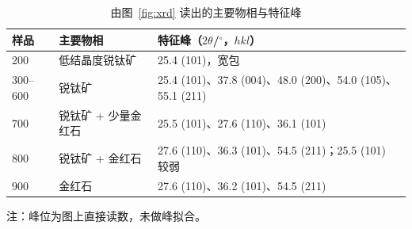 \begin{table}[H]
  \centering
  \caption{由图~\ref{fig:xrd} 读出的主要物相与特征峰}
  \label{tab:phase}
  \small
  \begin{tabular}{@{}p{1.2cm}p{3.2cm}p{10.8cm}@{}}
    \toprule
    样品 & 主要物相 & 特征峰（$2\theta$/$^\circ$，$hkl$） \\
    \midrule
    200 & 低结晶度锐钛矿 & 25.4 (101)，宽包 \\
    300--600 & 锐钛矿 & 25.4 (101)、37.8 (004)、48.0 (200)、54.0 (105)、55.1 (211) \\
    700 & 锐钛矿 + 少量金红石 & 25.5 (101)、27.6 (110)、36.1 (101) \\
    800 & 锐钛矿 + 金红石 & 27.6 (110)、36.3 (101)、54.5 (211)；25.5 (101) 较弱 \\
    900 & 金红石 & 27.6 (110)、36.2 (101)、54.5 (211) \\
    \bottomrule
  \end{tabular}
  \par\vspace{3pt}
  {\footnotesize 注：峰位为图上直接读数，未做峰拟合。}
\end{table}
